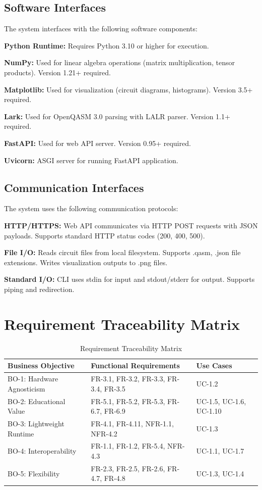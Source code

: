 \subsection{Software Interfaces}
The system interfaces with the following software components:

\textbf{Python Runtime:} Requires Python 3.10 or higher for execution.

\textbf{NumPy:} Used for linear algebra operations (matrix multiplication, tensor products). Version 1.21+ required.

\textbf{Matplotlib:} Used for visualization (circuit diagrams, histograms). Version 3.5+ required.

\textbf{Lark:} Used for OpenQASM 3.0 parsing with LALR parser. Version 1.1+ required.

\textbf{FastAPI:} Used for web API server. Version 0.95+ required.

\textbf{Uvicorn:} ASGI server for running FastAPI application.

\subsection{Communication Interfaces}
The system uses the following communication protocols:

\textbf{HTTP/HTTPS:} Web API communicates via HTTP POST requests with JSON payloads. Supports standard HTTP status codes (200, 400, 500).

\textbf{File I/O:} Reads circuit files from local filesystem. Supports .qasm, .json file extensions. Writes visualization outputs to .png files.

\textbf{Standard I/O:} CLI uses stdin for input and stdout/stderr for output. Supports piping and redirection.

\section{Requirement Traceability Matrix}

\begin{table}[H]
\centering
\caption{Requirement Traceability Matrix}
\begin{tabular}{|p{2.5cm}|p{4cm}|p{6cm}|}
\hline
\textbf{Business Objective} & \textbf{Functional Requirements} & \textbf{Use Cases} \\
\hline
BO-1: Hardware Agnosticism & FR-3.1, FR-3.2, FR-3.3, FR-3.4, FR-3.5 & UC-1.2 \\
\hline
BO-2: Educational Value & FR-5.1, FR-5.2, FR-5.3, FR-6.7, FR-6.9 & UC-1.5, UC-1.6, UC-1.10 \\
\hline
BO-3: Lightweight Runtime & FR-4.1, FR-4.11, NFR-1.1, NFR-4.2 & UC-1.3 \\
\hline
BO-4: Interoperability & FR-1.1, FR-1.2, FR-5.4, NFR-4.3 & UC-1.1, UC-1.7 \\
\hline
BO-5: Flexibility & FR-2.3, FR-2.5, FR-2.6, FR-4.7, FR-4.8 & UC-1.3, UC-1.4 \\
\hline
\end{tabular}
\end{table}
\FloatBarrier

